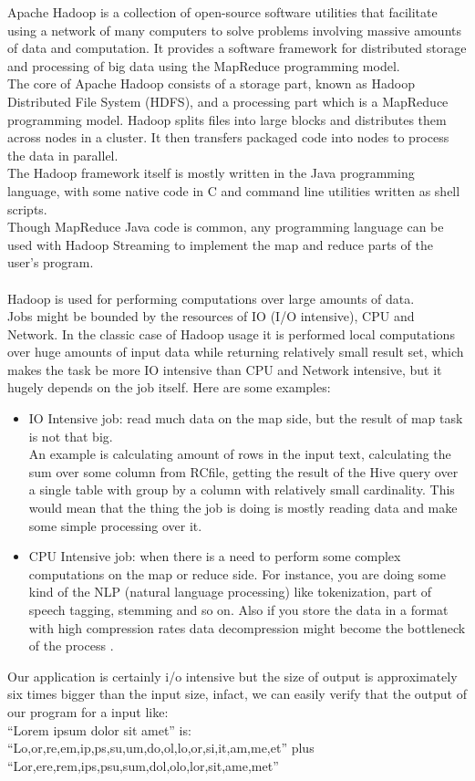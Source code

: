 \documentclass[10pt,twocolumn,letterpaper]{article}
\begin{document}
Apache Hadoop is a collection of open-source software utilities that facilitate using a network of many computers to solve problems involving massive amounts of data and computation. It provides a software framework for distributed storage and processing of big data using the MapReduce programming model.\\
The core of Apache Hadoop consists of a storage part, known as Hadoop Distributed File System (HDFS), and a processing part which is a MapReduce programming model. Hadoop splits files into large blocks and distributes them across nodes in a cluster. It then transfers packaged code into nodes to process the data in parallel.\\
The Hadoop framework itself is mostly written in the Java programming language, with some native code in C and command line utilities written as shell scripts.\\
Though MapReduce Java code is common, any programming language can be used with Hadoop Streaming to implement the map and reduce parts of the user's program.\\\\
Hadoop is used for performing computations over large amounts of data.\\
Jobs might be bounded by the resources of IO (I/O intensive), CPU and Network. In the classic case of Hadoop usage it is performed local computations over huge amounts of input data while returning relatively small result set, which makes the task be more IO intensive than CPU and Network intensive, but it hugely depends on the job itself. Here are some examples:
\begin{itemize}
    \item IO Intensive job: read much data on the map side, but the result of map task is not that big.\\
    An example is calculating amount of rows in the input text, calculating the sum over some column from RCfile, getting the result of the Hive query over a single table with group by a column with relatively small cardinality. This would mean that the thing the job is doing is mostly reading data and make some simple processing over it.

    \item CPU Intensive job: when there is a need to perform some complex computations on the map or reduce side. For instance, you are doing some kind of the NLP (natural language processing) like tokenization, part of speech tagging, stemming and so on. Also if you store the data in a format with high compression rates data decompression might become the bottleneck of the process .
\end{itemize}
Our application is certainly i/o intensive but the size of output is approximately six times bigger than the input size, infact, we can easily verify that the output of our program for a input like:\\
“Lorem ipsum dolor sit amet” is:\\
“Lo,or,re,em,ip,ps,su,um,do,ol,lo,or,si,it,am,me,et” plus “Lor,ere,rem,ips,psu,sum,dol,olo,lor,sit,ame,met”\\
 
\end{document}
